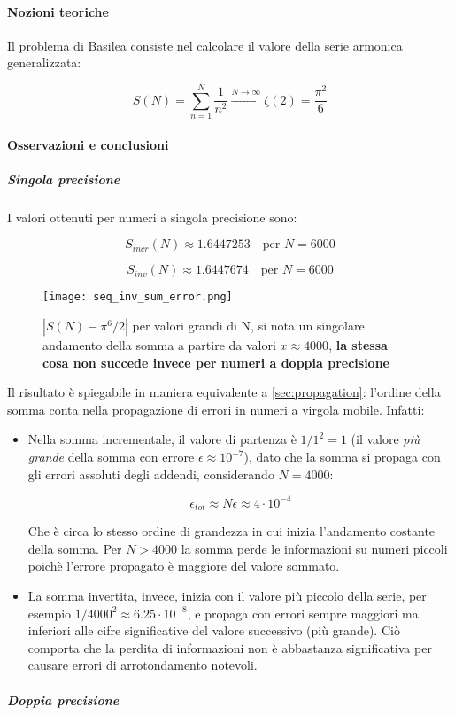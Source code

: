 \paragraph{Nozioni teoriche}

Il problema di Basilea consiste nel calcolare il valore della serie armonica generalizzata:

$$
	S(N) = \sum_{n=1}^{N} \frac{1}{n^2} \xrightarrow{N \to \infty} \zeta(2) = \frac{\pi^2}{6}
$$

\paragraph{Osservazioni e conclusioni}

\subparagraph{Singola precisione}

I valori ottenuti per numeri a singola precisione sono:

$$
	S_{incr}(N) \approx \mathtt{1.6447253} \quad \text{per } N = 6000
$$

$$
	S_{inv}(N) \approx \mathtt{1.6447674} \quad \text{per } N = 6000
$$

\begin{figure}[H]
	\texttt{[image: seq\_inv\_sum\_error.png]}
	\caption{$|S(N) - \pi^6 / 2|$ per valori grandi di N, si nota un singolare
		andamento della somma a partire da valori $ x \approx 4000$, \textbf{la
			stessa cosa non succede invece per numeri a doppia precisione}}
\end{figure}

Il risultato è spiegabile in maniera equivalente a \ref{sec:propagation}: l'ordine
della somma conta nella propagazione di errori in numeri a virgola mobile. Infatti:
\begin{itemize}
	\item Nella somma incrementale, il valore di partenza è $1/1^2 = 1$ (il valore
	      \textit{più grande} della somma con errore $\epsilon \approx 10^{-7}$),
	      dato che la somma si propaga con gli errori assoluti degli addendi,
	      considerando $N = 4000$:

	      $$\epsilon_{tot} \approx N \epsilon \approx 4 \cdot 10^{-4}$$

	      Che è circa lo stesso ordine di grandezza in cui inizia l'andamento costante
	      della somma. Per $N > 4000$ la somma perde le informazioni su numeri piccoli
	      poichè l'errore propagato è maggiore del valore sommato.

	\item La somma invertita, invece, inizia con il valore più piccolo della serie,
	      per esempio $1/4000^2 \approx 6.25 \cdot 10^{-8}$, e propaga con errori sempre maggiori
	      ma inferiori alle cifre significative del valore successivo (più grande).
	      Ciò comporta che la perdita di informazioni non è abbastanza significativa
	      per causare errori di arrotondamento notevoli.
\end{itemize}
\subparagraph{Doppia precisione}

